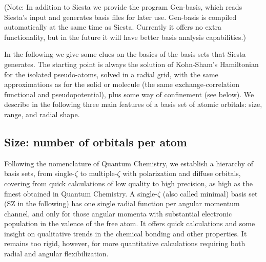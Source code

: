 \documentclass[11pt]{article}
\begin{document}
(Note: In addition to {\sc Siesta} we provide the program {\sc
Gen-basis}, which reads {\sc
Siesta}'s input and generates basis files for later use. {\sc
Gen-basis} is compiled automatically at the same time as {\sc
Siesta}. Currently it offers no extra functionality, but in the future
it will have better basis analysis capabilities.)

In the following we give some clues on the basics of the basis sets
that {\sc Siesta} generates. 
  The starting point is always the solution of Kohn-Sham's Hamiltonian
for the isolated pseudo-atoms, solved in a radial grid,
with the same approximations as for the solid or molecule 
(the same exchange-correlation functional and  pseudopotential),
plus some way of confinement (see below).
  We describe in the following three main features of a
basis set of atomic orbitals: size, range, and radial shape.

\subsection{Size: number of orbitals per atom}

  Following the nomenclature of Quantum Chemistry, we establish
a hierarchy of basis sets, from single-$\zeta$ to multiple-$\zeta$ 
with polarization and diffuse orbitals, covering from quick calculations
of low quality to high precision, as high as the finest obtained in
Quantum Chemistry. 
  A single-$\zeta$ (also called minimal) basis set (SZ in the following)
has one single radial function per angular momentum channel, and only for 
those angular momenta with substantial electronic population in the valence of
the free atom.
  It offers quick calculations and some insight on qualitative trends 
in the chemical bonding and other properties. 
  It remains too rigid, however, for more quantitative calculations
requiring both radial and angular flexibilization.
\end{document}
